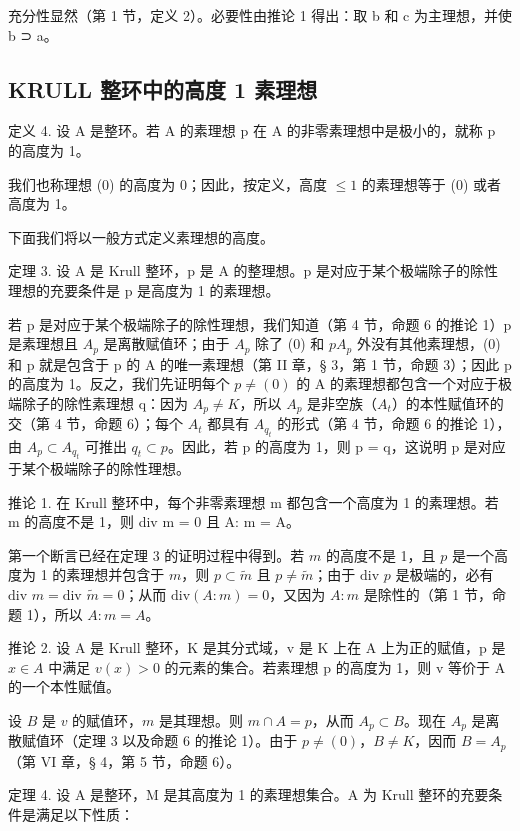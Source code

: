 充分性显然（第 1 节，定义 2）。必要性由推论 1 得出：取 b 和 c 为主理想，并使 b ⊃ a。

\subsection{KRULL 整环中的高度 1 素理想}

定义 4. 设 A 是整环。若 A 的素理想 p 在 A 的非零素理想中是极小的，就称 p 的高度为 1。

我们也称理想 (0) 的高度为 0；因此，按定义，高度 \(\leqslant 1\) 的素理想等于 (0) 或者高度为 1。

下面我们将以一般方式定义素理想的高度。

定理 3. 设 A 是 Krull 整环，p 是 A 的整理想。p 是对应于某个极端除子的除性理想的充要条件是 p 是高度为 1 的素理想。

若 p 是对应于某个极端除子的除性理想，我们知道（第 4 节，命题 6 的推论 1）p 是素理想且 \(A_{p}\) 是离散赋值环；由于 \(A_{p}\) 除了 (0) 和 \(pA_{p}\) 外没有其他素理想，(0) 和 p 就是包含于 p 的 A 的唯一素理想（第 II 章，§ 3，第 1 节，命题 3）；因此 p 的高度为 1。反之，我们先证明每个 \(p \neq (0)\) 的 A 的素理想都包含一个对应于极端除子的除性素理想 q：因为 \(A_{p} \neq K\)，所以 \(A_{p}\) 是非空族（\(A_{t}\)）的本性赋值环的交（第 4 节，命题 6）；每个 \(A_{t}\) 都具有 \(A_{q_{t}}\) 的形式（第 4 节，命题 6 的推论 1），由 \(A_{p} \subset A_{q_{t}}\) 可推出 \(q_{t} \subset p\)。因此，若 p 的高度为 1，则 p = q，这说明 p 是对应于某个极端除子的除性理想。

推论 1. 在 Krull 整环中，每个非零素理想 m 都包含一个高度为 1 的素理想。若 m 的高度不是 1，则 div m = 0 且 A: m = A。

第一个断言已经在定理 3 的证明过程中得到。若 \(m\) 的高度不是 1，且 \(p\) 是一个高度为 1 的素理想并包含于 \(m\)，则 \(p \subset \tilde{m}\) 且 \(p \neq \tilde{m}\)；由于 \(\text{div } p\) 是极端的，必有 \(\text{div } m = \text{div } \tilde{m} = 0\)；从而 \(\text{div}(A: m) = 0\)，又因为 \(A: m\) 是除性的（第 1 节，命题 1），所以 \(A: m = A\)。

推论 2. 设 A 是 Krull 整环，K 是其分式域，v 是 K 上在 A 上为正的赋值，p 是 \(x \in A\) 中满足 \(v(x) > 0\) 的元素的集合。若素理想 p 的高度为 1，则 v 等价于 A 的一个本性赋值。

设 \(B\) 是 \(v\) 的赋值环，\(m\) 是其理想。则 \(m \cap A = p\)，从而 \(A_p \subset B\)。现在 \(A_p\) 是离散赋值环（定理 3 以及命题 6 的推论 1）。由于 \(p \neq (0)\)，\(B \neq K\)，因而 \(B = A_p\)（第 VI 章，§ 4，第 5 节，命题 6）。

定理 4. 设 A 是整环，M 是其高度为 1 的素理想集合。A 为 Krull 整环的充要条件是满足以下性质：

